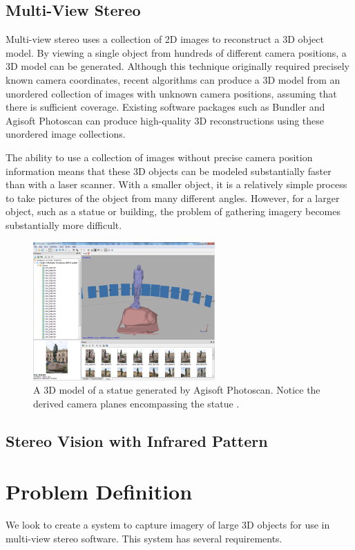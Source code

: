 \subsection{Multi-View Stereo}
Multi-view stereo uses a collection of 2D images to reconstruct a 3D object model. By viewing a single object from hundreds of different camera positions, a 3D model can be generated. Although this technique originally required precisely known camera coordinates, recent algorithms can produce a 3D model from an unordered collection of images with unknown camera positions, assuming that there is sufficient coverage. Existing software packages such as Bundler and Agisoft Photoscan can produce high-quality 3D reconstructions using these unordered image collections. \cite{bundler}\cite{photoscan}

The ability to use a collection of images without precise camera position information means that these 3D objects can be modeled substantially faster than with a laser scanner. With a smaller object, it is a relatively simple process to take pictures of the object from many different angles. However, for a larger object, such as a statue or building, the problem of gathering imagery becomes substantially more difficult.

\begin{figure}
\centering
\includegraphics[height=200px]{../images/photoscan.png}
\caption{A 3D model of a statue generated by Agisoft Photoscan. Notice the derived camera planes encompassing the statue \cite{photoscan}.}
\end{figure}

\subsection{Stereo Vision with Infrared Pattern}


\section{Problem Definition}
We look to create a system to capture imagery of large 3D objects for use in multi-view stereo software. This system has several requirements.

